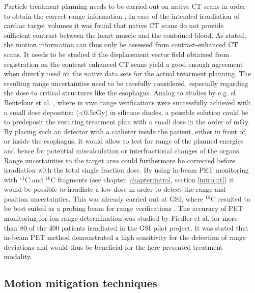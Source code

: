Particle treatment planning needs to be carried out on native CT scans in order to obtain the correct range information \cite{Wer04}. In case 
of the intended irradiation of cardiac target volumes it was found that native CT scans do not provide sufficient contrast between the  
heart muscle and the contained blood. As stated, the motion information can thus only be assessed from contrast-enhanced CT scans. 
It needs to be studied if the displacement vector field obtained from registration on the contrast enhanced CT scans yield a good enough 
agreement when directly used on the native data sets for the actual treatment planning. 
The resulting range uncertainties need to be carefully considered, especially regarding the dose to critical structures like the esophagus. 
Analog to studies by e.g. el Bentefour et al. \cite{Bent12}, where in vivo range verifications were 
successfully achieved with a small dose deposition (<0.5cGy) in silicone diodes, a possible solution could be to predeposit the resulting 
treatment plan with a small dose in the order of mGy. By placing such an detector with a catheter inside the patient, either in front of 
or inside the esophagus, it would allow to test for range of the planned energies and hence for potential miscalculation or 
interfractional changes of the organs. Range uncertainties to the target area could furthermore be corrected before irradiation with the 
total single fraction dose. By using in-beam PET monitoring with $^{11}$C and $^{10}$C fragments (see chapter \ref{chapter:intro}, section 
\ref{intro:nt}) it would be possible to irradiate a low dose in order to detect the range and position uncertainties. This was already carried 
out at GSI, where $^{10}$C resulted to be best suited as a probing beam for range verifications \cite{Lin12}. 
The accuracy of PET monitoring for ion range determination was studied by Fiedler et al. \cite{Fie10} for more than 80 of the 400 patients 
irradiated in the GSI pilot project. It was stated that in-beam PET method demonstrated a high sensitivity for the 
detection of range deviations and would thus be beneficial for the here presented treatment modality. 


\subsection{Motion mitigation techniques}
\label{diss:mmt}

